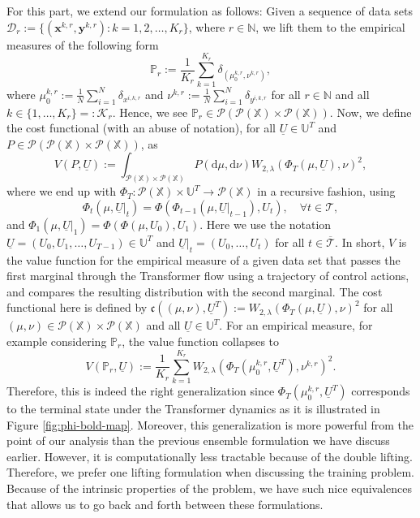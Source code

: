 \documentclass[11pt]{article}
\newcommand{\NN}{\mathbb{N}}
\newcommand{\XX}{\mathbb{X}}
\newcommand{\UU}{\mathbb{U}}
\newcommand{\PP}{\mathbb{P}}
\newcommand{\cD}{\mathcal{D}}
\newcommand{\cK}{\mathcal{K}}
\newcommand{\cP}{\mathcal{P}}
\newcommand{\cT}{\mathcal{T}}
\newcommand{\fc}{\mathfrak{c}}
\newcommand{\de}{\mathrm{d}} %
\begin{document}
For this part, we extend our formulation as follows: Given a sequence of data sets $\cD_r := \{(\boldsymbol{x}^{k,r}, \boldsymbol{y}^{k,r}) : k=1,2,\ldots,K_r\}$, where $r\in\NN$, we lift them to the empirical measures of the following form
\begin{equation*}
    \PP_r := \frac{1}{K_r}\sum_{k=1}^{K_r}\delta_{(\mu_0^{k,r}, \nu^{k,r})},
\end{equation*}
where $\mu_0^{k,r} := \frac{1}{N}\sum_{i=1}^N\delta_{x^{i,k,r}}$ and $\nu^{k,r} := \frac{1}{N}\sum_{i=1}^N\delta_{y^{i,k,r}}$ for all $r\in\NN$ and all $k\in\{1,\ldots,K_r\} =: \cK_r$. Hence, we see $\PP_r \in \cP(\cP(\XX)\times\cP(\XX))$. Now, we define the cost functional (with an abuse of notation), for all $\underline{U}\in\UU^T$ and $P\in \cP(\cP(\XX)\times\cP(\XX))$, as
\begin{equation*}
    V(P, \underline{U}) := \int_{\cP(\XX)\times\cP(\XX)}P(\de\mu,\de\nu)W_{2,\lambda}(\Phi_T(\mu, \underline{U}), \nu)^2,
\end{equation*}
where we end up with $\Phi_T:\cP(\XX)\times\UU^T\to\cP(\XX)$ in a recursive fashion, using
\begin{equation*}
    \Phi_{t}(\mu, \underline{U}|_{t}) = \Phi(\Phi_{t-1}(\mu, \underline{U}|_{t-1}), U_{t}), \quad \forall t\in\cT,
\end{equation*}
and $\Phi_{1}(\mu, \underline{U}|_1) = \Phi(\Phi(\mu, U_0), U_1)$. Here we use the notation $\underline{U} = (U_0,U_1,\ldots,U_{T-1})\in\UU^T$ and $\underline{U}|_t = (U_0,\ldots,U_t)$ for all $t\in\overline{\cT}$. In short, $V$ is the value function for the empirical measure of a given data set that passes the first marginal through the Transformer flow using a trajectory of control actions, and compares the resulting distribution with the second marginal. The cost functional here is defined by $\fc((\mu,\nu), \underline{U}^T) := W_{2,\lambda}(\Phi_T(\mu, \underline{U}), \nu)^2$ for all $(\mu,\nu) \in \cP(\XX)\times\cP(\XX)$ and all $\underline{U}\in\UU^T$. For an empirical measure, for example considering $\PP_r$, the value function collapses to
\begin{equation*}
    V(\PP_r, \underline{U}) := \frac{1}{K_r}\sum_{k=1}^{K_r} W_{2,\lambda}(\Phi_T(\mu_0^{k,r}, \underline{U}^T), \nu^{k,r})^2.
\end{equation*}
Therefore, this is indeed the right generalization since $\Phi_T(\mu_0^{k,r}, \underline{U}^T)$ corresponds to the terminal state under the Transformer dynamics as it is illustrated in Figure \ref{fig:phi-bold-map}. Moreover, this generalization is more powerful from the point of our analysis than the previous ensemble formulation we have discuss earlier. However, it is computationally less tractable because of the double lifting. Therefore, we prefer one lifting formulation when discussing the training problem. Because of the intrinsic properties of the problem, we have such nice equivalences that allows us to go back and forth between these formulations.
\end{document}
